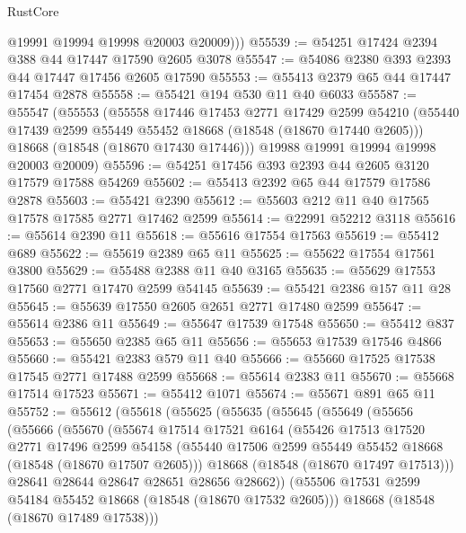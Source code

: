 \begin{lexlean}{RustCore}
\begin{coremodule}
          @19991
          @19994
          @19998
          @20003
          @20009)))
@55539 := @54251 @17424 @2394 @388 @44 @17447 @17590 @2605 @3078
@55547 := @54086 @2380 @393 @2393 @44 @17447 @17456 @2605 @17590
@55553 := @55413 @2379 @65 @44 @17447 @17454 @2878
@55558 := @55421 @194 @530 @11 @40 @6033
@55587 := @55547
    (@55553
      (@55558
        @17446
        @17453
        @2771
        @17429
        @2599
        @54210
        (@55440 @17439 @2599 @55449 @55452 @18668 (@18548 (@18670 @17440 @2605)))
        @18668
        (@18548 (@18670 @17430 @17446)))
      @19988
      @19991
      @19994
      @19998
      @20003
      @20009)
@55596 := @54251 @17456 @393 @2393 @44 @2605 @3120 @17579 @17588 @54269
@55602 := @55413 @2392 @65 @44 @17579 @17586 @2878
@55603 := @55421 @2390
@55612 := @55603 @212 @11 @40 @17565 @17578 @17585 @2771 @17462 @2599
@55614 := @22991 @52212 @3118
@55616 := @55614 @2390 @11
@55618 := @55616 @17554 @17563
@55619 := @55412 @689
@55622 := @55619 @2389 @65 @11
@55625 := @55622 @17554 @17561 @3800
@55629 := @55488 @2388 @11 @40 @3165
@55635 := @55629 @17553 @17560 @2771 @17470 @2599 @54145
@55639 := @55421 @2386 @157 @11 @28
@55645 := @55639 @17550 @2605 @2651 @2771 @17480 @2599
@55647 := @55614 @2386 @11
@55649 := @55647 @17539 @17548
@55650 := @55412 @837
@55653 := @55650 @2385 @65 @11
@55656 := @55653 @17539 @17546 @4866
@55660 := @55421 @2383 @579 @11 @40
@55666 := @55660 @17525 @17538 @17545 @2771 @17488 @2599
@55668 := @55614 @2383 @11
@55670 := @55668 @17514 @17523
@55671 := @55412 @1071
@55674 := @55671 @891 @65 @11
@55752 := @55612
    (@55618
      (@55625
        (@55635
          (@55645
            (@55649
              (@55656
                (@55666
                  (@55670
                    (@55674
                      @17514
                      @17521
                      @6164
                      (@55426
                        @17513
                        @17520
                        @2771
                        @17496
                        @2599
                        @54158
                        (@55440 @17506 @2599 @55449 @55452 @18668 (@18548 (@18670 @17507 @2605)))
                        @18668
                        (@18548 (@18670 @17497 @17513)))
                      @28641
                      @28644
                      @28647
                      @28651
                      @28656
                      @28662))
                  (@55506 @17531 @2599 @54184 @55452 @18668 (@18548 (@18670 @17532 @2605)))
                  @18668
                  (@18548 (@18670 @17489 @17538)))

\end{coremodule}
\end{lexlean}

